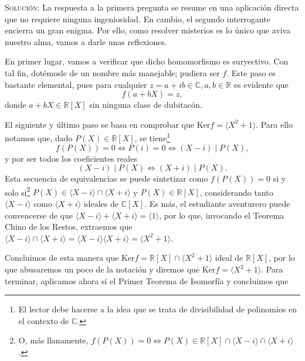 \documentclass{article}
\renewcommand{\ker}{\text{Ker}}
\begin{document}
\begin{enumerate}
    \vspace{7px}

    \textsc{Solución}: La respuesta a la primera pregunta se resume en una aplicación directa que no requiere ninguna ingeniosidad. En cambio, el segundo interrogante encierra un gran enigma. Por ello, como resolver misterios es lo único que aviva nuestro alma, vamos a darle unas reflexiones.

    En primer lugar, vamos a verificar que dicho homomorfismo es suryectivo. Con tal fin, dotémosle de un nombre más manejable; pudiera ser $f$. Este paso es bastante elemental, pues para cualquier $z = a + ib \in \mathbb{C}, a, b \in \mathbb{R}$ es evidente que \[f(a + bX) = z,\] donde $a + bX \in \mathbb{R}[X]$ sin ninguna clase de dubitacón.

    El siguiente y último paso se basa en comprobar que $\ker f = \langle X^2 + 1\rangle$. Para ello notamos que, dado $P(X) \in \mathbb{R}[X]$, se tiene\footnote{El lector debe hacerse a la idea que se trata de divisibilidad de polinomios en el contexto de $\mathbb{C}$.} \[f(P(X)) = 0 \iff P(i) = 0 \iff (X - i) \mid P(X),\] y por ser todos los coeficientes reales \[(X - i) \mid P(X) \iff (X + i) \mid P(X).\] Esta secuencia de equivalencias se puede sintetizar como $f(P(X)) = 0$ si y solo si\footnote{O, más llanamente, $f(P(X)) = 0 \iff P(X) \in \mathbb{R}[X] \cap \langle X - i \rangle \cap \langle X + i \rangle$.} $P(X) \in \langle X - i \rangle \cap \langle X + i \rangle$ y $P(X) \in \mathbb{R}[X]$, considerando tanto $\langle X - i \rangle$ como $\langle X + i \rangle$ ideales de $\mathbb{C}[X]$.
    Es más, el estudiante aventurero puede convencerse de que $\langle X - i \rangle + \langle X + i \rangle = \langle 1 \rangle$, por lo que, invocando el Teorema Chino de los Restos, extraemos que $\langle X - i \rangle \cap \langle X + i \rangle = \langle X - i \rangle \langle X + i \rangle = \langle X^2 + 1 \rangle$.


    Concluimos de esta manera que $\ker f = \mathbb{R}[X] \cap \langle X^2 + 1 \rangle$ ideal de $\mathbb{R}[X]$, por lo que abusaremos un poco de la notación y diremos que $\ker f = \langle X^2 + 1 \rangle$. Para terminar, aplicamos ahora sí el Primer Teorema de Isomorfía y concluimos que


\end{enumerate}
\end{document}

